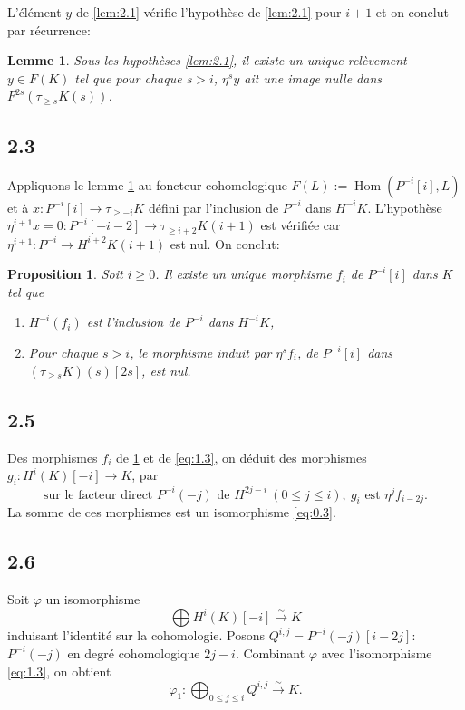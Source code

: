 \documentclass[11pt,a4paper]{article}
\theoremstyle{plain}
\newtheorem{lemma}[theorem]{Lemme}
\newtheorem{proposition}[theorem]{Proposition}
\theoremstyle{definition}
\DeclareMathOperator{\Hom}{Hom}
\begin{document}
L'\'el\'ement $y$ de \ref{lem:2.1} v\'erifie l'hypoth\`ese de \ref{lem:2.1} pour $i+1$ et on conclut par r\'ecurrence:

\begin{lemma}\label{lem:2.2}
Sous les hypoth\`eses \ref{lem:2.1}, il existe un unique rel\`evement $y \in F(K)$ tel que pour chaque $s > i$, $\eta^s y$ ait une image nulle dans $F^{2s}(\tau_{\geqslant s} K(s))$.
\end{lemma}

\subsection*{2.3}
Appliquons le lemme \ref{lem:2.2} au foncteur cohomologique $F(L) := \Hom(P^{-i}[i], L)$ et \`a $x \colon P^{-i}[i] \to \tau_{\geqslant -i} K$ d\'efini par l'inclusion de $P^{-i}$ dans $H^{-i} K$. L'hypoth\`ese $\eta^{i+1} x = 0 \colon P^{-i}[-i-2] \to \tau_{\geqslant i+2} K(i+1)$ est v\'erifi\'ee car $\eta^{i+1} \colon P^{-i} \to H^{i+2} K(i+1)$ est nul. On conclut:

\begin{proposition}\label{prop:2.4}
Soit $i \geqslant 0$. Il existe un unique morphisme $f_i$ de $P^{-i}[i]$ dans $K$ tel que
\begin{enumerate}[label=\textup{(\roman*)}]
\item $H^{-i}(f_i)$ est l'inclusion de $P^{-i}$ dans $H^{-i} K$,
\item Pour chaque $s > i$, le morphisme induit par $\eta^s f_i$, de $P^{-i}[i]$ dans $(\tau_{\geqslant s} K)(s)[2s]$, est nul.
\end{enumerate}
\end{proposition}

\subsection*{2.5}
Des morphismes $f_i$ de \ref{prop:2.4} et de \eqref{eq:1.3}, on d\'eduit des morphismes $g_i \colon H^i(K)[-i] \to K$, par
\begin{equation}\label{eq:2.5.1}
\text{sur le facteur direct } P^{-i}(-j) \text{ de } H^{2j-i}\ (0 \leqslant j \leqslant i),\ g_i \text{ est } \eta^j f_{i-2j}.
\end{equation}
La somme de ces morphismes est un isomorphisme \eqref{eq:0.3}.

\subsection*{2.6}
Soit $\varphi$ un isomorphisme
\[
\bigoplus H^i(K)[-i] \xrightarrow{\sim} K
\]
induisant l'identit\'e sur la cohomologie. Posons $Q^{i,j} = P^{-i}(-j)[i-2j]$: $P^{-i}(-j)$ en degr\'e cohomologique $2j-i$. Combinant $\varphi$ avec l'isomorphisme \eqref{eq:1.3}, on obtient
\begin{equation}\label{eq:2.6.1}
\varphi_1 \colon \bigoplus_{0 \leqslant j \leqslant i} Q^{i,j} \xrightarrow{\sim} K.
\end{equation}
\end{document}
